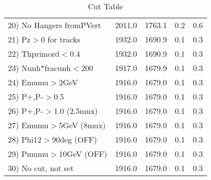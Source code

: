\begin{table}[h!]
\begin{tabular}{||l||r|r|r|r||}
 20) No Hangers fromPVert &      2011.0 &      1763.1 &         0.2 &         0.6 \\
 21) Pz$>$0 for tracks    &      1932.0 &      1690.9 &         0.1 &         0.3 \\
 22) Thprimord$<$0.4      &      1932.0 &      1690.9 &         0.1 &         0.3 \\
 23) Nunh*fracunh$<$200   &      1917.0 &      1679.9 &         0.1 &         0.3 \\
 24) Emumu$>$2GeV         &      1916.0 &      1679.0 &         0.1 &         0.3 \\
 25) P+,P-$>$0.5          &      1916.0 &      1679.0 &         0.1 &         0.3 \\
 26) P+,P-$>$1.0 (2.5mux) &      1916.0 &      1679.0 &         0.1 &         0.3 \\
 27) Emumu$>$5GeV  (8mux) &      1916.0 &      1679.0 &         0.1 &         0.3 \\
 28) Phi12$>$90deg  (OFF) &      1916.0 &      1679.0 &         0.1 &         0.3 \\
 29) Pmumu$>$10GeV  (OFF) &      1916.0 &      1679.0 &         0.1 &         0.3 \\
 30) No cut, not set      &      1916.0 &      1679.0 &         0.1 &         0.3 \\
 \hline
 \hline
 \end{tabular}
 \caption{Cut Table \cohjp  }
 \label{tab-cut__jpsi}
 \end{table}
